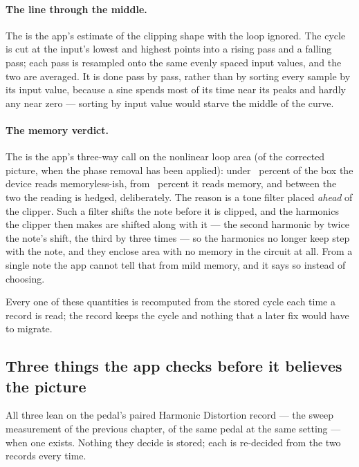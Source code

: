 \documentclass[11pt,a4paper]{article}
\begin{document}
\paragraph{The line through the middle.} The  is the
app's estimate of the clipping shape with the loop ignored. The cycle is
cut at the input's lowest and highest points into a rising pass and a
falling pass; each pass is resampled onto the same \tcStaticGrid{} evenly
spaced input values, and the two are averaged. It is done pass by pass,
rather than by sorting every sample by its input value, because a sine
spends most of its time near its peaks and hardly any near zero ---
sorting by input value would starve the middle of the curve.

\paragraph{The memory verdict.} The  is the app's
three-way call on the nonlinear loop area (of the corrected picture, when
the phase removal has been applied): under \tcMemorylessBelowPct{}~percent
of the box the device reads memoryless-ish, from \tcMemoryFromPct{}~percent
it reads memory, and between the two the reading is hedged, deliberately.
The reason is a tone filter placed \emph{ahead} of the clipper. Such a
filter shifts the note before it is clipped, and the harmonics the clipper
then makes are shifted along with it --- the second harmonic by twice the
note's shift, the third by three times --- so the harmonics no longer keep
step with the note, and they enclose area with no memory in the circuit at
all. From a single note the app cannot tell that from mild memory, and it
says so instead of choosing.

Every one of these quantities is recomputed from the stored cycle each
time a record is read; the record keeps the cycle and nothing that a later
fix would have to migrate.

\subsection{Three things the app checks before it believes the picture}

All three lean on the pedal's paired Harmonic Distortion record --- the
sweep measurement of the previous chapter, of the same pedal at the same
setting --- when one exists. Nothing they decide is stored; each is
re-decided from the two records every time.
\end{document}
